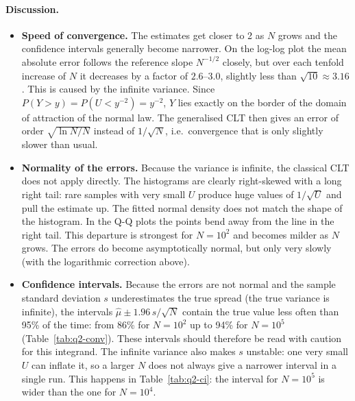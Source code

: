 \documentclass[11pt,a4paper]{article}
\begin{document}
\paragraph{Discussion.}
\begin{itemize}
  \item \textbf{Speed of convergence.} The estimates get closer to 2 as $N$ grows and the
  confidence intervals generally become narrower. On the log-log plot the mean absolute error follows the
  reference slope $N^{-1/2}$ closely, but over each tenfold increase of $N$ it decreases by a
  factor of $2.6$--$3.0$, slightly less than $\sqrt{10} \approx 3.16$. This is caused by the
  infinite variance. Since $P(Y > y) = P(U < y^{-2}) = y^{-2}$, $Y$ lies exactly on the border
  of the domain of attraction of the normal law. The generalised CLT then gives an error of order
  $\sqrt{\ln N / N}$ instead of $1/\sqrt N$, i.e.\ convergence that is only slightly slower than
  usual.

  \item \textbf{Normality of the errors.} Because the variance is infinite, the classical CLT
  does not apply directly. The histograms are clearly right-skewed with a long right tail: rare
  samples with very small $U$ produce huge values of $1/\sqrt U$ and pull the estimate up. The
  fitted normal density does not match the shape of the histogram. In the Q-Q plots the points
  bend away from the line in the right tail. This departure is strongest for $N = 10^2$ and
  becomes milder as $N$ grows. The errors do become asymptotically normal, but only very slowly
  (with the logarithmic correction above).

  \item \textbf{Confidence intervals.} Because the errors are not normal and the sample standard
  deviation $s$ underestimates the true spread (the true variance is infinite), the intervals
  $\hat\mu \pm 1.96\,s/\sqrt N$ contain the true value less often than 95\% of the time: from
  86\% for $N = 10^2$ up to 94\% for $N = 10^5$ (Table~\ref{tab:q2-conv}). These intervals
  should therefore be read with caution for this integrand. The infinite variance also makes $s$
  unstable: one very small $U$ can inflate it, so a larger $N$ does not always give a narrower
  interval in a single run. This happens in Table~\ref{tab:q2-ci}: the interval for $N = 10^5$ is
  wider than the one for $N = 10^4$.
\end{itemize}

\end{document}
